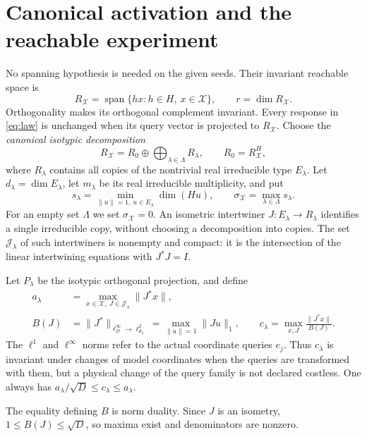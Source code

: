 \section{Canonical activation and the reachable experiment}\label{sec:activation41}
No spanning hypothesis is needed on the given seeds. Their invariant
reachable space is
\begin{equation}\label{eq:reachable41}
 R_{\mathcal X}=\operatorname{span}\{hx:h\in H,\ x\in\mathcal X\},
 \qquad r=\dim R_{\mathcal X}.
\end{equation}
Orthogonality makes its orthogonal complement invariant. Every response
in \eqref{eq:law} is unchanged when its query vector is projected to
$R_{\mathcal X}$. Choose the \emph{canonical isotypic decomposition}
\[
 R_{\mathcal X}=R_0\oplus\bigoplus_{\lambda\in\Lambda}R_\lambda,
 \qquad R_0=R_{\mathcal X}^{H},
\]
where $R_\lambda$ contains all copies of the nontrivial real irreducible
type $E_\lambda$. Let $d_\lambda=\dim E_\lambda$, let $m_\lambda$ be
its real irreducible multiplicity, and put
\[
 s_\lambda=\min_{\|u\|=1,\ u\in E_\lambda}\dim(Hu),\qquad
 \sigma_{\mathcal X}=\max_{\lambda\in\Lambda}s_\lambda.
\]
For an empty set $\Lambda$ we set $\sigma_{\mathcal X}=0$.
An isometric intertwiner $J:E_\lambda\to R_\lambda$ identifies a single
irreducible copy, without choosing a decomposition into copies. The set
$\mathcal J_\lambda$ of such intertwiners is nonempty and compact: it is
the intersection of the linear intertwining equations with $J^*J=I$.

\begin{definition}\label{def:activation41}
Let $P_\lambda$ be the isotypic orthogonal projection, and define
\begin{align}
 a_\lambda&=\max_{x\in\mathcal X,\ J\in\mathcal J_\lambda}\|J^*x\|,
 \label{eq:canonical-a41}\\
 B(J)&=\|J^*\|_{\ell^\infty_D\to\ell^2_{d_\lambda}}
      =\max_{\|u\|=1}\|Ju\|_1,\qquad
 c_\lambda=\max_{x,J}\frac{\|J^*x\|}{B(J)}.
 \label{eq:canonical-c41}
\end{align}
The $\ell^1$ and $\ell^\infty$ norms refer to the actual coordinate
queries $e_j$. Thus $c_\lambda$ is invariant under changes of model
coordinates when the queries are transformed with them, but a physical
change of the query family is not declared costless. One always has
$a_\lambda/\sqrt D\le c_\lambda\le a_\lambda$.
\end{definition}
The equality defining $B$ is norm duality. Since $J$ is an isometry,
$1\le B(J)\le\sqrt D$, so maxima exist and denominators are nonzero.

